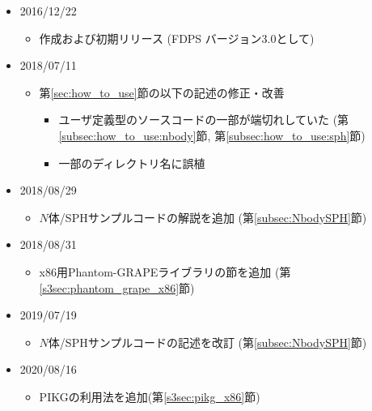 \begin{itemize}
\item 2016/12/22
  \begin{itemize}
  \item 作成および初期リリース (FDPS バージョン3.0として)
  \end{itemize}
\item 2018/07/11
  \begin{itemize}
  \item 第\ref{sec:how_to_use}節の以下の記述の修正・改善
    \begin{itemize}
    \item ユーザ定義型のソースコードの一部が端切れしていた (第\ref{subsec:how_to_use:nbody}節, 第\ref{subsec:how_to_use:sph}節)
    \item 一部のディレクトリ名に誤植
    \end{itemize}
  \end{itemize}
\item 2018/08/29
  \begin{itemize}
  \item $N$体/SPHサンプルコードの解説を追加 (第\ref{subsec:NbodySPH}節)
  \end{itemize}
\item 2018/08/31
  \begin{itemize}
  \item x86用Phantom-GRAPEライブラリの節を追加 (第\ref{s3sec:phantom_grape_x86}節)
  \end{itemize}
\item 2019/07/19
  \begin{itemize}
  \item $N$体/SPHサンプルコードの記述を改訂 (第\ref{subsec:NbodySPH}節)
  \end{itemize}
\item 2020/08/16
  \begin{itemize}
  \item PIKGの利用法を追加(第\ref{s3sec:pikg_x86}節)
  \end{itemize}

\end{itemize}

